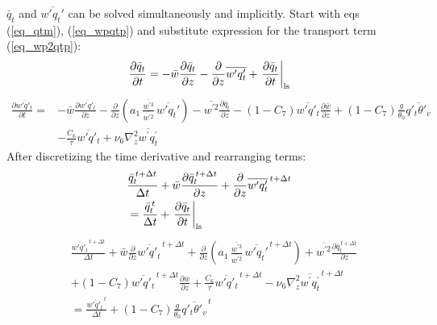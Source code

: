 \documentclass[11pt,fleqn]{article}
\newcommand{\ptlder}[2]{\frac{\partial #1}{\partial #2}}
\begin{document}
$\bar{q}_t$ and $\overline{w'q_t'}$ can be solved simultaneously and
implicitly.
Start with eqs (\ref{eq_qtm}), (\ref{eq_wpqtp}) and substitute expression
for the transport term (\ref{eq_wp2qtp}):
%
\begin{equation}
\ptlder{\bar{q}_t}{t}
= - \bar{w}\ptlder{\bar{q}_t}{z} 
  - \ptlder{}{z}\overline{w'q'_t} 
  + \left. \ptlder{\bar{q}_t}{t} \right|_{\rm ls}
\end{equation}
%
\begin{equation}
\begin{split}
\ptlder{\overline{w'q'_t}}{t} 
= & - \bar{w}\ptlder{\overline{w'q'_t}}{z}	 		
    - \ptlder{}{z}
      \left(   
               a_1 \,
               \frac{\overline{w^{'3}}}{\overline{w^{'2}}} \,
               \overline{w'q_t'}
      \right)
    - \overline{w^{'2}}\ptlder{\bar{q}_t}{z} 
    - (1-C_7) \overline{w'q'_t}\ptlder{\bar{w}}{z}
    + (1-C_7) \frac{g}{\theta_0} \overline{q'_t\theta'_v} \\
  & - \frac{C_6}{\tau}\overline{w'q'_t}
    + \nu_6 \nabla_z^2 \overline{w^{'}q_t^{'}}
\end{split}
\end{equation}
%
After discretizing the time derivative and rearranging terms:
%
\begin{equation}
\label{eq_qxm2}
\begin{split}
& \frac{\bar{q}_t^{\, t+\Delta t}}{\Delta t}
  + \bar{w}\ptlder{\bar{q}_t^{\, t+\Delta t}}{z} 
  + \ptlder{}{z}\overline{w'q'_t}^{\, t+\Delta t} \\
& = \frac{\bar{q}_t^{\, t}}{\Delta t}
  + \left. \ptlder{\bar{q}_t}{t} \right|_{\rm ls}
\end{split}
\end{equation}
%
\begin{equation}
\label{eq_wpqxp2}
\begin{split}
& \frac{\overline{w'q'_t}^{\, t+\Delta t}}{\Delta t} 
  + \bar{w}\ptlder{}{z}\overline{w'q'_t}^{\, t+\Delta t}
  + \ptlder{}{z}
    \left(   
             a_1 \,
             \frac{\overline{w^{'3}}}{\overline{w^{'2}}} \,
             \overline{w'q_t'}^{\, t+\Delta t}
    \right)
  + \overline{w^{'2}}\ptlder{\bar{q}_t^{\, t+\Delta t}}{z} \\
& + (1-C_7) \overline{w'q'_t}^{\, t+\Delta t}\ptlder{\bar{w}}{z}
  + \frac{C_6}{\tau}\overline{w'q'_t}^{\, t+\Delta t}
  - \nu_6 \nabla_z^2 \overline{w^{'}q_t^{'}}^{\, t+\Delta t} \\
& = \frac{\overline{w'q'_t}^{\, t}}{\Delta t} 
    + (1-C_7) \frac{g}{\theta_0} \overline{q'_t\theta'_v}^{\, t}
\end{split}
\end{equation}
\end{document}
